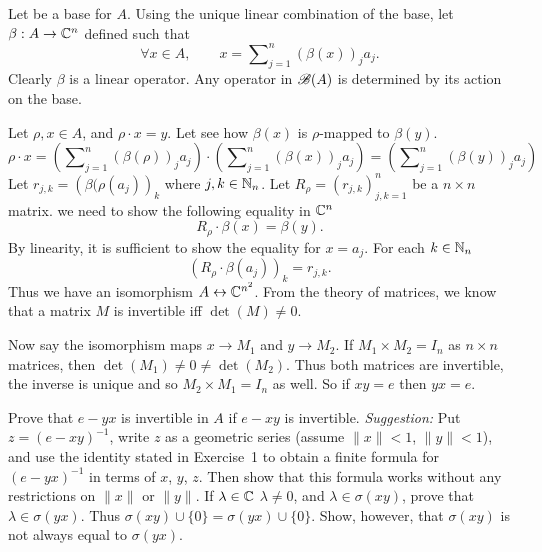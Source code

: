 \begin{enumerate}
Let  be a base for $A$.
Using the unique linear combination of the base,
let \(\beta: A \to \mathbb{C}^n\) defined such that
\begin{equation*}
 \forall x\in A, \qquad
 x = \sum\nolimits_{j=1}^n \left(\beta(x)\right)_j a_j.
\end{equation*}
Clearly \(\beta\) is a linear operator.
Any operator in \(\mathscr{B}(A)\) is determined by its action on the base.
\iffalse
For any \(j,k\in\N_n\) let \(b_{j,k}\) be defined such that
\begin{equation*}
a_j\cdot a_k = \sum\nolimits_{k=1}^n b_{j,k} a_k.
\end{equation*}
\fi
Let \(\rho,x \in A\), and \(\rho\cdot x = y\).
Let see how \(\beta(x)\) is \(\rho\)-mapped to \(\beta(y)\).
\begin{equation*}
\rho\cdot x =
  \left(\sum\nolimits_{j=1}^n \left(\beta(\rho)\right)_j a_j\right)
  \cdot
  \left(\sum\nolimits_{j=1}^n \left(\beta(x)\right)_j a_j\right)
  =
  \left(\sum\nolimits_{j=1}^n \left(\beta(y)\right)_j a_j\right)
\end{equation*}
Let \(r_{j,k} = \left(\beta(\rho(a_j)\right)_k\) where \(j,k\in\N_n\).
Let \(R_\rho = (r_{j,k})_{j,k=1}^n\) be a \(n\times n\) matrix.
we need to show the following equality in \(\mathbb{C}^n\)
\begin{equation*}
R_\rho\cdot \beta(x) = \beta(y).
\end{equation*}
By linearity, it is sufficient to show the equality for \(x=a_j\).
For each \(k\in\mathbb{N}_n\)
\begin{equation*}
\left(R_\rho\cdot \beta(a_j) \right)_k = r_{j,k}.
\end{equation*}
Thus we have an isomorphism \(A \leftrightarrow \mathbb{C}^{n^2}\).
From the theory of matrices, we know that a matrix $M$ is
invertible iff \(\det(M)\neq 0\).

Now say the isomorphism maps \(x\to M_1\) and \(y\to M_2\).
If \(M_1\times M_2 = I_n\) as \(n\times n\) matrices,
then \(\det(M_1) \neq 0 \neq \det(M_2)\).
Thus both matrices are invertible, the inverse is unique
and so  \(M_2\times M_1 = I_n\) as well.
So if \(xy=e\) then \(yx=e\).

\begin{excopy}
\begin{itemize}
Prove that \(e - yx\) is invertible in $A$
if \(e - xy\) is invertible. \emph{Suggestion:} Put
\(z =(e-xy)^{-1}\), write $z$ as a geometric series
(assume \(\|x\| < 1\), \(\|y\| < 1\)), and
use the identity stated in Exercise~1
to obtain a finite formula for \((e - yx)^{-1}\)
in terms of $x$, $y$, $z$. Then show that this formula works without any
restrictions on \(\|x\|\) or \(\|y\|\).
If \(\lambda \in \mathbb{C}\) \(\lambda \neq 0\),
  and \(\lambda \in \sigma(xy)\), prove that \(\lambda \in \sigma(yx)\).
  Thus \(\sigma(xy) \cup \{0\} = \sigma(yx) \cup \{0\}\).
  Show, however, that \(\sigma(xy)\) is not always equal to \(\sigma(yx)\).
\end{itemize}
\end{excopy}


\end{enumerate}

